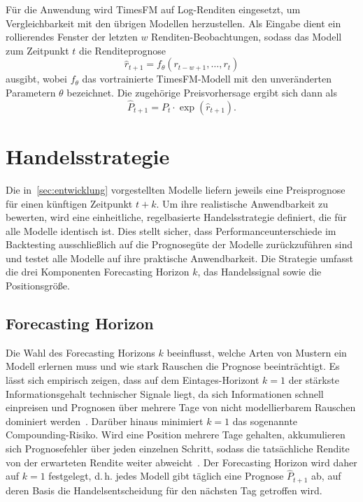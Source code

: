 Für die Anwendung wird TimesFM auf Log-Renditen eingesetzt, um Vergleichbarkeit mit den übrigen Modellen herzustellen. Als Eingabe dient ein rollierendes Fenster der letzten $w$ Renditen-Beobachtungen, sodass das Modell zum Zeitpunkt $t$ die Renditeprognose
\begin{equation}
    \hat{r}_{t+1} = f_\theta(r_{t-w+1}, \ldots, r_t)
\end{equation}
ausgibt, wobei $f_\theta$ das vortrainierte TimesFM-Modell mit den unveränderten Parametern $\theta$ bezeichnet. Die zugehörige Preisvorhersage ergibt sich dann als
\begin{equation}
    \hat{P}_{t+1} = P_t \cdot \exp(\hat{r}_{t+1}).
\end{equation}

\section{Handelsstrategie}\label{sec:marktstrategie}

Die in~\cref{sec:entwicklung} vorgestellten Modelle liefern jeweils eine Preisprognose für einen künftigen Zeitpunkt $t+k$. Um ihre realistische Anwendbarkeit zu bewerten, wird eine einheitliche, regelbasierte Handelsstrategie definiert, die für alle Modelle identisch ist. Dies stellt sicher, dass Performanceunterschiede im Backtesting ausschließlich auf die Prognosegüte der Modelle zurückzuführen sind und testet alle Modelle auf ihre praktische Anwendbarkeit. Die Strategie umfasst die drei Komponenten Forecasting Horizon $k$, das Handelssignal sowie die Positionsgröße.

\subsection{Forecasting Horizon}\label{subsec:horizon}

Die Wahl des Forecasting Horizons $k$ beeinflusst, welche Arten von Mustern ein Modell erlernen muss und wie stark Rauschen die Prognose beeinträchtigt. Es lässt sich empirisch zeigen, dass auf dem Eintages-Horizont $k=1$ der stärkste Informationsgehalt technischer Signale liegt, da sich Informationen schnell einpreisen und Prognosen über mehrere Tage von nicht modellierbarem Rauschen dominiert werden~\cite{ait2010highfrequency}. Darüber hinaus minimiert $k=1$ das sogenannte Compounding-Risiko. Wird eine Position mehrere Tage gehalten, akkumulieren sich Prognosefehler über jeden einzelnen Schritt, sodass die tatsächliche Rendite von der erwarteten Rendite weiter abweicht~\cite{lo2002statistics}. Der Forecasting Horizon wird daher auf $k = 1$ festgelegt, d.\,h. jedes Modell gibt täglich eine Prognose $\hat{P}_{t+1}$ ab, auf deren Basis die Handelsentscheidung für den nächsten Tag getroffen wird.

